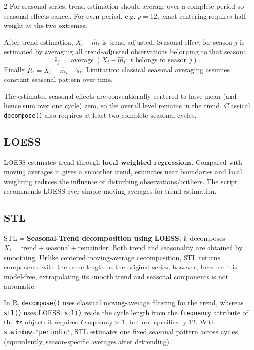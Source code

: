 \documentclass[9pt,a4paper]{extarticle}
\newcommand{\key}[1]{\textbf{#1}}
\begin{document}
\begin{multicols}{2}
For seasonal series, trend estimation should average over a complete period so seasonal effects cancel. For even period, e.g. \(p=12\), exact centering requires half-weight at the two extremes.

After trend estimation, \(X_t-\widehat m_t\) is trend-adjusted. Seasonal effect for season \(j\) is estimated by averaging all trend-adjusted observations belonging to that season:
\[
\widehat s_j=\operatorname{average}(X_t-\widehat m_t:\ t\text{ belongs to season }j).
\]
Finally \(\boxed{\widehat R_t=X_t-\widehat m_t-\widehat s_t}\). Limitation: classical seasonal averaging assumes constant seasonal pattern over time.

The estimated seasonal effects are conventionally centered to have mean (and hence sum over one cycle) zero, so the overall level remains in the trend. Classical \texttt{decompose()} also requires at least two complete seasonal cycles.

\subsection{LOESS}

LOESS estimates trend through \key{local weighted regressions}. Compared with moving averages it gives a smoother trend, estimates near boundaries and local weighting reduces the influence of disturbing observations/outliers. The script recommends LOESS over simple moving averages for trend estimation.

\subsection{STL}

STL = \key{Seasonal-Trend decomposition using LOESS}; it decomposes \(X_t=\text{trend}+\text{seasonal}+\text{remainder}\). Both trend and seasonality are obtained by smoothing. Unlike centered moving-average decomposition, STL returns components with the same length as the original series; however, because it is model-free, extrapolating its smooth trend and seasonal components is not automatic.

In R, \texttt{decompose()} uses classical moving-average filtering for the trend, whereas \texttt{stl()} uses LOESS. \texttt{stl()} reads the cycle length from the \texttt{frequency} attribute of the \texttt{ts} object: it requires \(\texttt{frequency}>1\), but not specifically 12. With \texttt{s.window="periodic"}, STL estimates one fixed seasonal pattern across cycles (equivalently, season-specific averages after detrending).


\end{multicols}
\end{document}
